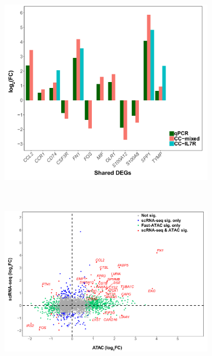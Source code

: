\bigskip
\begin{figure}[H]
\centering
\begin{subfigure}[b]{0.50\textwidth}
\centering 
\includegraphics[width=\textwidth]{./Results3/pdfs/PSA_scRNAseq_PCR_array_overlapping_genes_log2FC}
\caption{}
\end{subfigure}
~
\begin{subfigure}[b]{0.70\textwidth} 
\centering
\includegraphics[width=\textwidth]{./Results3/pdfs/PSA_ATAC_scRNA_CD14_correlation_plot}
\caption{}
\end{subfigure}

\end{figure}
